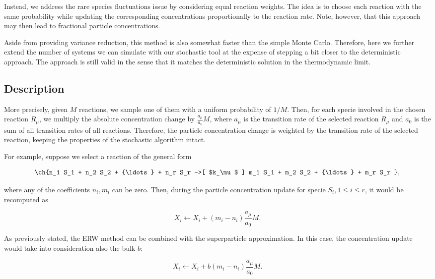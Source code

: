 Instead, we address the rare species fluctuations issue by considering equal reaction weights. The idea is to choose each reaction with the same probability while updating the corresponding concentrations proportionally to the reaction rate. Note, however, that this approach may then lead to fractional particle concentrations.

Aside from providing variance reduction, this method is also somewhat faster than the simple Monte Carlo. Therefore, here we further extend the number of systems we can simulate with our stochastic tool at the expense of stepping a bit closer to the deterministic approach. The approach is still valid in the sense that it matches the deterministic solution in the thermodynamic limit.

\subsection{Description}

More precisely, given $M$ reactions, we sample one of them with a uniform probability of $1/M$. Then, for each specie involved in the chosen reaction $R_\mu$, we multiply the absolute concentration change by $\frac{a_\mu}{a_0}M$, where $a_\mu$ is the transition rate of the selected reaction $R_\mu$ and $a_0$ is the sum of all transition rates of all reactions. Therefore, the particle concentration change is weighted by the transition rate of the selected reaction, keeping the properties of the stochastic algorithm intact.

For example, suppose we select a reaction of the general form

\begin{center}
\begin{gather*}
\ch{n_1 S_1 + n_2 S_2 + {\ldots} + n_r S_r ->[ $k_\mu$ ] m_1 S_1 + m_2 S_2 + {\ldots} + m_r S_r }, 
\end{gather*}
\end{center}

where any of the coefficients $n_i, m_i$ can be zero. Then, during the particle concentration update for specie $S_i, 1 \leq i \leq r$, it would be recomputed as 

$$X_i \leftarrow X_i + (m_i - n_i) \frac{a_\mu}{a_0}M.$$

As previously stated, the ERW method can be combined with the superparticle approximation. In this case, the concentration update would take into consideration also the bulk $b$:

$$X_i \leftarrow X_i + b (m_i - n_i) \frac{a_\mu}{a_0}M.$$

